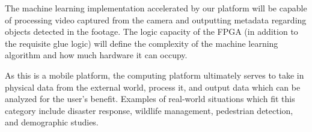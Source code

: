 
% 



The machine learning implementation accelerated by our platform will be capable of processing video captured from the camera and outputting metadata regarding objects detected in the footage. The logic capacity of the FPGA (in addition to the requisite glue logic) will define the complexity of the machine learning algorithm and how much hardware it can occupy. 

As this is a mobile platform, the computing platform ultimately serves to take in physical data from the external world, process it, and output data which can be analyzed for the user's benefit. Examples of real-world situations which fit this category include disaster response, wildlife management, pedestrian detection, and demographic studies.



